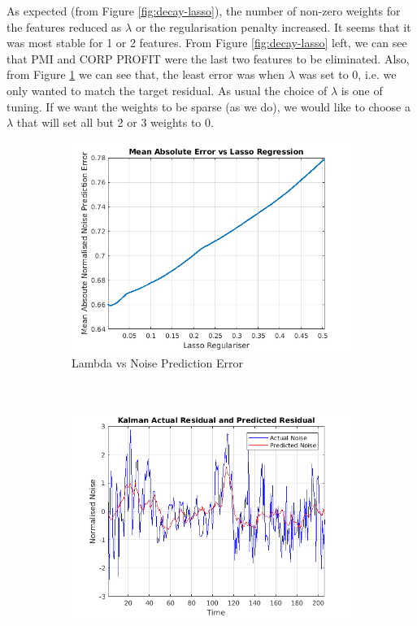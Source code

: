 \documentclass[11pt, fleqn]{article}
\begin{document}
As expected (from Figure \ref{fig:decay-lasso}), the number of non-zero weights for the features reduced as $\lambda$ or the regularisation penalty increased. It seems that it was most stable for 1 or 2 features. From Figure \ref{fig:decay-lasso} left, we can see that PMI and CORP PROFIT were the last two features to be eliminated. Also, from Figure \ref{fig:error-vs-lambda} we can see that, the least error was when $\lambda$ was set to 0, i.e. we only wanted to match the target residual. As usual the choice of $\lambda$ is one of tuning. If we want the weights to be sparse (as we do), we would like to choose a $\lambda$ that will set all but 2 or 3 weights to 0.\\

\begin{figure}[!h]
    \centering
	\begin{subfigure}[b]{0.3\textwidth}
        \includegraphics[width=\textwidth]{error-vs-lambda.png}
	\caption{Lambda vs Noise Prediction Error}
	\label{fig:error-vs-lambda}
    \end{subfigure}
    ~ 
	\begin{subfigure}[b]{0.3\textwidth}
        \includegraphics[width=\textwidth]{noise-prediction.png}

\end{subfigure}
\end{figure}
\end{document}
